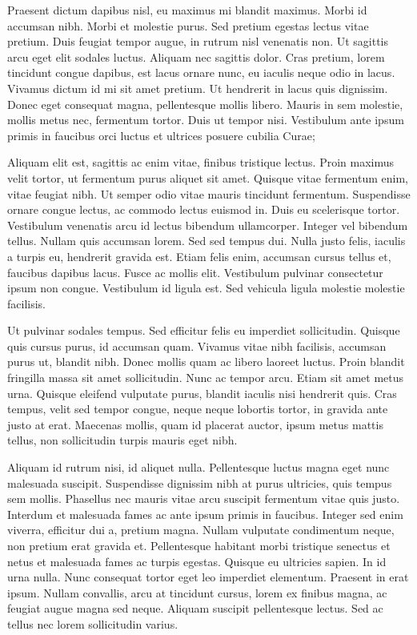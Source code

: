 
Praesent dictum dapibus nisl, eu maximus mi blandit maximus. Morbi id accumsan nibh. Morbi et molestie purus. Sed pretium egestas lectus vitae pretium. Duis feugiat tempor augue, in rutrum nisl venenatis non. Ut sagittis arcu eget elit sodales luctus. Aliquam nec sagittis dolor. Cras pretium, lorem tincidunt congue dapibus, est lacus ornare nunc, eu iaculis neque odio in lacus. Vivamus dictum id mi sit amet pretium. Ut hendrerit in lacus quis dignissim. Donec eget consequat magna, pellentesque mollis libero. Mauris in sem molestie, mollis metus nec, fermentum tortor. Duis ut tempor nisi. Vestibulum ante ipsum primis in faucibus orci luctus et ultrices posuere cubilia Curae;

Aliquam elit est, sagittis ac enim vitae, finibus tristique lectus. Proin maximus velit tortor, ut fermentum purus aliquet sit amet. Quisque vitae fermentum enim, vitae feugiat nibh. Ut semper odio vitae mauris tincidunt fermentum. Suspendisse ornare congue lectus, ac commodo lectus euismod in. Duis eu scelerisque tortor. Vestibulum venenatis arcu id lectus bibendum ullamcorper. Integer vel bibendum tellus. Nullam quis accumsan lorem. Sed sed tempus dui. Nulla justo felis, iaculis a turpis eu, hendrerit gravida est. Etiam felis enim, accumsan cursus tellus et, faucibus dapibus lacus. Fusce ac mollis elit. Vestibulum pulvinar consectetur ipsum non congue. Vestibulum id ligula est. Sed vehicula ligula molestie molestie facilisis.

Ut pulvinar sodales tempus. Sed efficitur felis eu imperdiet sollicitudin. Quisque quis cursus purus, id accumsan quam. Vivamus vitae nibh facilisis, accumsan purus ut, blandit nibh. Donec mollis quam ac libero laoreet luctus. Proin blandit fringilla massa sit amet sollicitudin. Nunc ac tempor arcu. Etiam sit amet metus urna. Quisque eleifend vulputate purus, blandit iaculis nisi hendrerit quis. Cras tempus, velit sed tempor congue, neque neque lobortis tortor, in gravida ante justo at erat. Maecenas mollis, quam id placerat auctor, ipsum metus mattis tellus, non sollicitudin turpis mauris eget nibh.

Aliquam id rutrum nisi, id aliquet nulla. Pellentesque luctus magna eget nunc malesuada suscipit. Suspendisse dignissim nibh at purus ultricies, quis tempus sem mollis. Phasellus nec mauris vitae arcu suscipit fermentum vitae quis justo. Interdum et malesuada fames ac ante ipsum primis in faucibus. Integer sed enim viverra, efficitur dui a, pretium magna. Nullam vulputate condimentum neque, non pretium erat gravida et. Pellentesque habitant morbi tristique senectus et netus et malesuada fames ac turpis egestas. Quisque eu ultricies sapien. In id urna nulla. Nunc consequat tortor eget leo imperdiet elementum. Praesent in erat ipsum. Nullam convallis, arcu at tincidunt cursus, lorem ex finibus magna, ac feugiat augue magna sed neque. Aliquam suscipit pellentesque lectus. Sed ac tellus nec lorem sollicitudin varius.